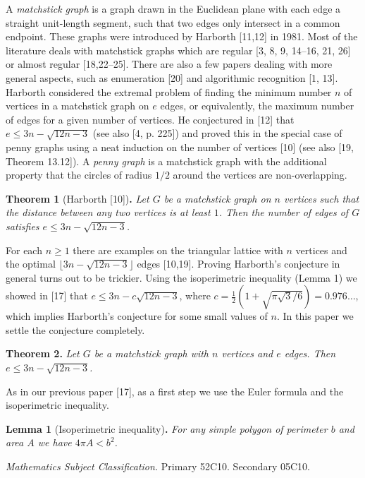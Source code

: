 \documentclass{article}
\begin{document}
A \textit{matchstick graph} is a graph drawn in the Euclidean plane with each edge a straight unit-length segment, such that two edges only intersect in a common endpoint. These graphs were introduced by Harborth [11,12] in 1981. Most of the literature deals with matchstick graphs which are regular [3, 8, 9, 14–16, 21, 26] or almost regular [18,22–25]. There are also a few papers dealing with more general aspects, such as enumeration [20] and algorithmic recognition [1, 13]. Harborth considered the extremal problem of finding the minimum number $n$ of vertices in a matchstick graph on $e$ edges, or equivalently, the maximum number of edges for a given number of vertices. He conjectured in [12] that $e \le 3n - \sqrt{12n - 3}$ (see also [4, p. 225]) and proved this in the special case of penny graphs using a neat induction on the number of vertices [10] (see also [19, Theorem 13.12]). A \textit{penny graph} is a matchstick graph with the additional property that the circles of radius $1/2$ around the vertices are non-overlapping.

\textbf{Theorem 1} (Harborth [10])\textbf{.} \textit{Let $G$ be a matchstick graph on $n$ vertices such that the distance between any two vertices is at least $1$. Then the number of edges of $G$ satisfies $e \le 3n - \sqrt{12n - 3}$.}

For each $n \ge 1$ there are examples on the triangular lattice with $n$ vertices and the optimal $\lfloor 3n - \sqrt{12n - 3}\rfloor$ edges [10,19]. Proving Harborth’s conjecture in general turns out to be trickier. Using the isoperimetric inequality (Lemma 1) we showed in [17] that $e \le 3n - c\sqrt{12n - 3}$, where $c = \frac{1}{2}(1 + \sqrt{\pi \sqrt{3}/6}) = 0.976 \ldots$, which implies Harborth’s conjecture for some small values of $n$. In this paper we settle the conjecture completely.

\textbf{Theorem 2.} \textit{Let $G$ be a matchstick graph with $n$ vertices and $e$ edges. Then $e \le 3n - \sqrt{12n - 3}$.}

As in our previous paper [17], as a first step we use the Euler formula and the isoperimetric inequality.

\textbf{Lemma 1} (Isoperimetric inequality)\textbf{.} \textit{For any simple polygon of perimeter $b$ and area $A$ we have $4\pi A < b^{2}$.}


 \textit{Mathematics Subject Classification.} Primary 52C10. Secondary 05C10.
\end{document}
